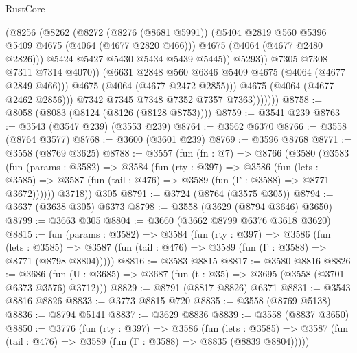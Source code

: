 \begin{lexlean}{RustCore}
\begin{coremodule}
                              (@8256
                                (@8262
                                  (@8272
                                    (@8276 (@8681 @5991))
                                    (@5404 @2819 @560 @5396 @5409 @4675 (@4064 (@4677 @2820 @466)))
                                    @4675
                                    (@4064 (@4677 @2480 @2826)))
                                  @5424
                                  @5427
                                  @5430
                                  @5434
                                  @5439
                                  @5445))
                              @5293))
                          @7305
                          @7308
                          @7311
                          @7314
                          @4070))
                      (@6631 @2848 @560 @6346 @5409 @4675 (@4064 (@4677 @2849 @466)))
                      @4675
                      (@4064 (@4677 @2472 @2855)))
                    @4675
                    (@4064 (@4677 @2462 @2856)))
                  @7342
                  @7345
                  @7348
                  @7352
                  @7357
                  @7363)))))))
@8758 := @8058 (@8083 (@8124 (@8126 (@8128 @8753))))
@8759 := @3541 @239
@8763 := @3543 (@3547 @239) (@3553 @239)
@8764 := @3562 @6370
@8766 := @3558 (@8764 @3577)
@8768 := @3600 (@3601 @239)
@8769 := @3596 @8768
@8771 := @3558 (@8769 @3625)
@8788 := @3557
    (fun (fn : @7) =>
    @8766
      (@3580
        (@3583
          (fun (params : @3582) =>
          @3584
            (fun (rty : @397) =>
            @3586
              (fun (lets : @3585) =>
              @3587 (fun (tail : @476) => @3589 (fun (Γ : @3588) => @8771 @3672))))))
        @3718))
    @305
@8791 := @3724 (@8764 (@3575 @305))
@8794 := @3637 (@3638 @305) @6373
@8798 := @3558 (@3629 (@8794 @3646) @3650)
@8799 := @3663 @305
@8804 := @3660 (@3662 @8799 @6376 @3618 @3620)
@8815 := fun (params : @3582) =>
  @3584
    (fun (rty : @397) =>
    @3586
      (fun (lets : @3585) =>
      @3587 (fun (tail : @476) => @3589 (fun (Γ : @3588) => @8771 (@8798 @8804)))))
@8816 := @3583 @8815
@8817 := @3580 @8816
@8826 := @3686 (fun (U : @3685) => @3687 (fun (t : @35) => @3695 (@3558 (@3701 @6373 @3576) @3712)))
@8829 := @8791 (@8817 @8826) @6371
@8831 := @3543 @8816 @8826
@8833 := @3773 @8815 @720
@8835 := @3558 (@8769 @5138)
@8836 := @8794 @5141
@8837 := @3629 @8836
@8839 := @3558 (@8837 @3650)
@8850 := @3776
    (fun (rty : @397) =>
    @3586
      (fun (lets : @3585) =>
      @3587 (fun (tail : @476) => @3589 (fun (Γ : @3588) => @8835 (@8839 @8804)))))

\end{coremodule}
\end{lexlean}
